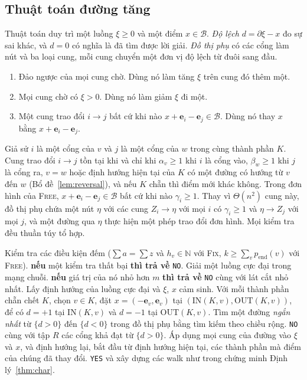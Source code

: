 \documentclass[pdflatex,sn-mathphys-num]{sn-jnl}
\theoremstyle{thmstyleone}%
\theoremstyle{thmstyletwo}%
\theoremstyle{thmstylethree}%
\newcommand{\N}{\mathbb{N}}
\newcommand{\cB}{\mathcal{B}}
\newcommand{\e}{\mathbf{e}}
\newcommand{\IN}{\mathrm{IN}}
\newcommand{\OUT}{\mathrm{OUT}}
\newcommand{\FIX}{\textup{\textsc{Fix}}}
\newcommand{\FREE}{\textup{\textsc{Free}}}
\newcommand{\YES}{\texttt{YES}}
\newcommand{\NO}{\texttt{NO}}
\begin{document}
\subsection{Thuật toán đường tăng}\label{sec:auxgraph}

Thuật toán duy trì một luồng $\xi\ge0$ và một điểm $x\in\cB$. \emph{Độ lệch} $d=\partial\xi-x$ đo sự sai khác, và $d=0$ có nghĩa là đã tìm được lời giải. \emph{Đồ thị phụ} có các cổng làm nút và ba loại cung, mỗi cung chuyển một đơn vị độ lệch từ đuôi sang đầu.
\begin{enumerate}
\item[(1)] Đảo ngược của mọi cung chờ. Dùng nó làm tăng $\xi$ trên cung đó thêm một.
\item[(2)] Mọi cung chờ có $\xi>0$. Dùng nó làm giảm $\xi$ đi một.
\item[(3)] Một cung trao đổi $i\to j$ bất cứ khi nào $x+\e_i-\e_j\in\cB$. Dùng nó thay $x$ bằng $x+\e_i-\e_j$.
\end{enumerate}
Giả sử $i$ là một cổng của $v$ và $j$ là một cổng của $w$ trong cùng thành phần $K$. Cung trao đổi $i\to j$ tồn tại khi và chỉ khi $\alpha_v\ge1$ khi $i$ là cổng vào, $\beta_w\ge1$ khi $j$ là cổng ra, $v=w$ hoặc định hướng hiện tại của $K$ có một đường có hướng từ $v$ đến $w$ (Bổ đề~\ref{lem:reversal}), và nếu $K$ chẵn thì điểm mới khác không. Trong đơn hình của \FREE{}, $x+\e_i-\e_j\in\cB$ bất cứ khi nào $\gamma_i\ge1$. Thay vì $\Theta(n^2)$ cung này, đồ thị phụ chứa một nút $\eta$ với các cung $Z_i\to\eta$ với mọi $i$ có $\gamma_i\ge1$ và $\eta\to Z_j$ với mọi $j$, và một đường qua $\eta$ thực hiện một phép trao đổi đơn hình. Mọi kiểm tra đều thuần túy tổ hợp.

\begin{algorithm}[t]
\caption{Thuật toán đường tăng cho \FIX{} và \FREE{}}\label{alg:pf}
\begin{algorithmic}[1]
\State Kiểm tra các điều kiện đếm ($\sum a=\sum z$ và $h_v\in\N$ với \FIX{}, $k\ge\sum_vp_{\mathrm{end}}(v)$ với \FREE{}). \textbf{nếu} một kiểm tra thất bại \textbf{thì trả về} \NO{}.
\State Giải một luồng cực đại trong mạng chuỗi. \textbf{nếu} giá trị của nó nhỏ hơn $m$ \textbf{thì trả về} \NO{} cùng với lát cắt nhỏ nhất.
\State Lấy định hướng của luồng cực đại và $\xi$, $x$ cảm sinh. Với mỗi thành phần chẵn chết $K$, chọn $v\in K$, đặt $x=(-\e_v,\e_v)$ tại $(\IN(K,v),\OUT(K,v))$, để có $d=+1$ tại $\IN(K,v)$ và $d=-1$ tại $\OUT(K,v)$.
  \State Tìm một đường \emph{ngắn nhất} từ $\{d>0\}$ đến $\{d<0\}$ trong đồ thị phụ bằng tìm kiếm theo chiều rộng.
    \State \Return \NO{} cùng với tập $R$ các cổng khả đạt từ $\{d>0\}$.
  \EndIf
  \State Áp dụng mọi cung của đường vào $\xi$ và $x$, và định hướng lại, bắt đầu từ định hướng hiện tại, các thành phần mà điểm của chúng đã thay đổi.
\EndWhile
\State \Return \YES{} và xây dựng các walk như trong chứng minh Định lý~\ref{thm:char}.
\end{algorithmic}
\end{algorithm}
\end{document}
